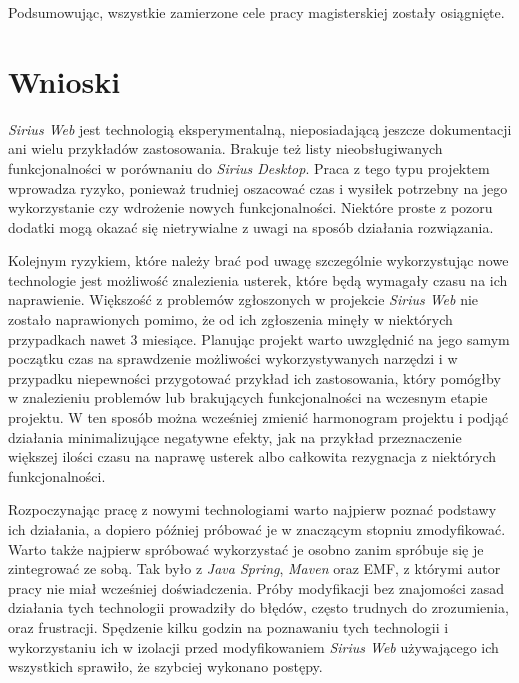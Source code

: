 Podsumowując, wszystkie zamierzone cele pracy magisterskiej zostały osiągnięte.

\section{Wnioski}

\emph{Sirius Web} jest technologią eksperymentalną, nieposiadającą jeszcze
dokumentacji ani wielu przykładów zastosowania. Brakuje też listy
nieobsługiwanych funkcjonalności w porównaniu do \emph{Sirius Desktop}. Praca z
tego typu projektem wprowadza ryzyko, ponieważ trudniej oszacować czas
i wysiłek potrzebny na jego wykorzystanie czy wdrożenie nowych funkcjonalności.
Niektóre proste z pozoru dodatki mogą okazać się nietrywialne z uwagi na sposób
działania rozwiązania.

Kolejnym ryzykiem, które należy brać pod uwagę szczególnie wykorzystując nowe
technologie jest możliwość znalezienia usterek, które będą wymagały czasu na
ich naprawienie. Większość z problemów zgłoszonych w projekcie \emph{Sirius
	Web}
nie zostało naprawionych pomimo, że od ich zgłoszenia minęły w niektórych
przypadkach nawet 3 miesiące. Planując projekt warto uwzględnić na jego samym
początku czas na sprawdzenie możliwości wykorzystywanych narzędzi i w przypadku
niepewności przygotować przykład ich zastosowania, który pomógłby w
znalezieniu problemów lub brakujących funkcjonalności na wczesnym etapie
projektu. W ten sposób można wcześniej zmienić harmonogram projektu i podjąć
działania minimalizujące negatywne efekty, jak na przykład przeznaczenie
większej ilości czasu na naprawę usterek albo całkowita rezygnacja z niektórych
funkcjonalności.

Rozpoczynając pracę z nowymi technologiami warto najpierw poznać podstawy ich
działania, a dopiero później próbować je w znaczącym stopniu zmodyfikować.
Warto także najpierw spróbować wykorzystać je osobno zanim spróbuje się je
zintegrować ze sobą. Tak było z \emph{Java Spring}, \emph{Maven} oraz
\gls{EMF}, z którymi autor pracy nie miał wcześniej doświadczenia. Próby
modyfikacji bez znajomości zasad działania tych technologii prowadziły do
błędów, często trudnych do zrozumienia, oraz frustracji. Spędzenie kilku godzin
na poznawaniu tych technologii i wykorzystaniu ich w izolacji przed
modyfikowaniem \emph{Sirius Web} używającego ich wszystkich sprawiło, że
szybciej wykonano postępy.


